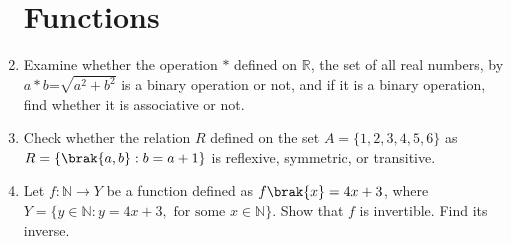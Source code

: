\begin{enumerate}
\section*{Functions}
\item Examine whether the operation $*$ defined on $\mathbb{R}$, the set of all real numbers, by $a*b$=${\sqrt{a^2 + b^2}}$ is a binary operation or not, and if it is a binary operation, find whether it is associative or not.
\item Check whether the relation $R$ defined on the set $A=\{1,2,3,4,5,6\}$ as\\
$R = \{\brak{a, b} : b = a + 1\}$ is reflexive, symmetric, or transitive.
\item Let $f : \mathbb{N} \rightarrow Y$ be a function defined as $f\brak{x} = 4x + 3$,
where $Y = \{y \in \mathbb{N} : y = 4x + 3, \text{ for some } x \in \mathbb{N}\}$. Show that $f$ is invertible. Find its inverse.       
\end{enumerate}